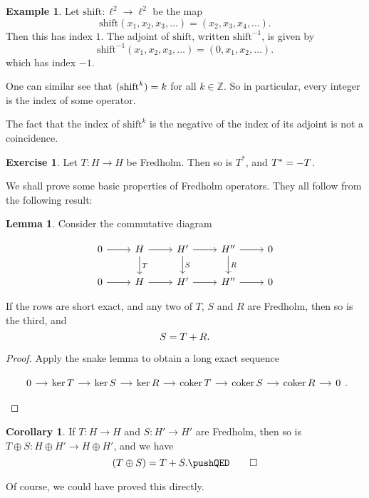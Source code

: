 \documentclass{shortart}
\theoremstyle{definition}
\newtheorem*{eg}{Example}
\newtheorem*{ex}{Exercise}
\newtheorem*{cor}{Corollary}
\newtheorem*{lemma}{Lemma}
\newcommand\Z{\mathbb{Z}}
\let\index\relax
\DeclareMathOperator{\index}{idx}
\DeclareMathOperator{\coker}{coker}
\begin{document}
\begin{eg}
  Let $\mathrm{shift}: \ell^2 \to \ell^2$ be the map
  \[
    \mathrm{shift}(x_1, x_2, x_3, \dots) = (x_2, x_3, x_4, \dots).
  \]
  Then this has index $1$. The adjoint of $\mathrm{shift}$, written $\mathrm{shift}^{-1}$, is given by
  \[
    \mathrm{shift}^{-1}(x_1, x_2, x_3, \dots) = (0, x_1, x_2, \dots).
  \]
  which has index $-1$.

  One can similar see that $\index (\mathrm{shift}^k) = k$ for all $k \in \Z$. So in particular, every integer is the index of some operator.
\end{eg}

The fact that the index of $\mathrm{shift}^k$ is the negative of the index of its adjoint is not a coincidence.

\begin{ex}
  Let $T: H \to H$ be Fredholm. Then so is $T^*$, and $\index T^* = - \index T$.
\end{ex}

We shall prove some basic properties of Fredholm operators. They all follow from the following result:

\begin{lemma}
  Consider the commutative diagram
  \begin{useimager}
    \[
      \begin{tikzcd}
        0 \ar[r] & H \ar[r] \ar[d, "T"] & H' \ar[r] \ar[d, "S"]& H'' \ar[r] \ar[d, "R"] & 0\\
        0 \ar[r] & H \ar[r] & H' \ar[r] & H'' \ar[r] & 0
      \end{tikzcd}
    \]
  \end{useimager}
  If the rows are short exact, and any two of $T$, $S$ and $R$ are Fredholm, then so is the third, and
  \[
    \index S = \index T + \index R.
  \]
\end{lemma}

\begin{proof}
  Apply the snake lemma to obtain a long exact sequence
  \begin{useimager}
    \[
      \begin{tikzcd}[column sep=small]
        0 \ar[r] & \ker T \ar[r] & \ker S \ar[r] & \ker R \ar[r] & \coker T \ar[r] & \coker S \ar[r] & \coker R \ar[r] & 0
      \end{tikzcd}.\qedhere
    \]
  \end{useimager}
\end{proof}

\begin{cor}
  If $T: H \to H$ and $S: H' \to H'$ are Fredholm, then so is $T \oplus S: H \oplus H' \to H \oplus H'$, and we have
  \[
    \index (T \oplus S) = \index T + \index S.\fakeqed
  \]
\end{cor}
Of course, we could have proved this directly.
\end{document}
